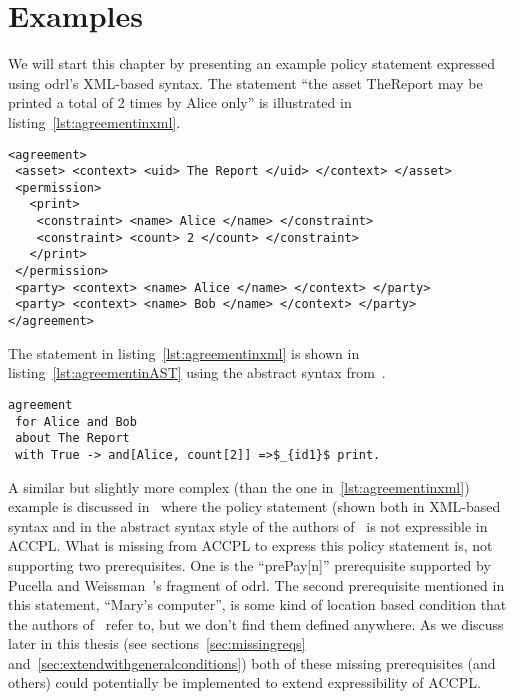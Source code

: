 \chapter{Examples}

We will start this chapter by presenting an example policy statement expressed using \ac{odrl}'s XML-based syntax. The statement ``the asset TheReport may be printed a total of 2 times by Alice only'' is illustrated in listing~\ref{lst:agreementinxml}. 

\lstset{language=XML}
\begin{lstlisting}[caption={First Agreement for Alice and Bob in XML}, label={lst:agreementinxml}]
<agreement>
 <asset> <context> <uid> The Report </uid> </context> </asset>
 <permission>
   <print>
    <constraint> <name> Alice </name> </constraint>
    <constraint> <count> 2 </count> </constraint>
   </print>
 </permission>
 <party> <context> <name> Alice </name> </context> </party>
 <party> <context> <name> Bob </name> </context> </party>
</agreement>
\end{lstlisting}

The statement in listing~\ref{lst:agreementinxml} is shown in listing~\ref{lst:agreementinAST} using the abstract syntax from~\cite{pucella2006}.

\lstset{language=Pucella2006}
\begin{lstlisting}[frame=single, caption={First Agreement for Alice and Bob}, label={lst:agreementinAST}, mathescape]
agreement
 for Alice and Bob 
 about The Report 
 with True -> and[Alice, count[2]] =>$_{id1}$ print.
\end{lstlisting}


A similar but slightly more complex (than the one in~\ref{lst:agreementinxml}) example is discussed in~\cite{pucella2006} where the policy statement (shown both in XML-based syntax and in the abstract syntax style of the authors of~\cite{pucella2006} is not expressible in \ac{ACCPL}. What is missing from \ac{ACCPL} to express this policy statement is, not supporting two prerequisites. One is the ``prePay[n]'' prerequisite supported by Pucella and Weissman~\cite{pucella2006}'s fragment of \ac{odrl}. The second prerequisite mentioned in this statement, ``Mary's computer'', is some kind of location based condition that the authors of~\cite{pucella2006} refer to, but we don't find them defined anywhere. As we discuss later in this thesis (see sections~\ref{sec:missingreqs} and~\ref{sec:extendwithgeneralconditions}) both of these missing prerequisites (and others) could potentially be implemented to extend expressibility of \ac{ACCPL}.

